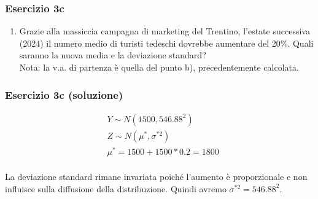 \documentclass{beamer}
\begin{document}
\begin{frame}[fragile]
	\frametitle{Esercizio 3c}
	\begin{enumerate}[c]
		\item Grazie alla massiccia campagna di marketing del Trentino, l'estate successiva (2024) il numero medio di turisti tedeschi dovrebbe aumentare del 20\%. Quali saranno la nuova media e la deviazione standard?
		\medskip\\
		Nota: la v.a. di partenza è quella del punto b), precedentemente calcolata.
	\end{enumerate}
\end{frame}



\begin{frame}[fragile]
	\frametitle{Esercizio 3c (soluzione)}

	\begin{align*}
		& Y \sim N(1500, 546.88^2) \\
		& Z \sim N(\mu^*, \sigma^{*2}) \\
		& \mu^* = 1500 + 1500 * 0.2 = 1800 \\
	\end{align*}

	La deviazione standard rimane invariata poiché l'aumento è proporzionale e non influisce sulla diffusione della distribuzione. Quindi avremo $\sigma^{*2} = 546.88^2$.

\end{frame}
\end{document}
